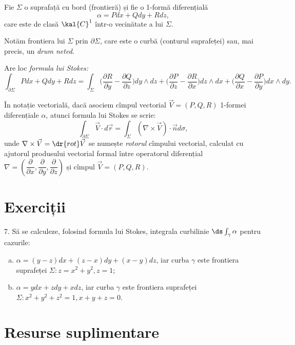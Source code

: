 Fie $ \Sigma $ o suprafață cu bord (frontieră) și fie o 1-formă diferențială
\[
  \alpha = Pdx + Qdy + Rdz,
\]
care este de clasă $ \kal{C}^1 $ într-o vecinătate a lui $ \Sigma $.

Notăm frontiera lui $ \Sigma $ prin $ \partial \Sigma $, care este o
curbă (conturul suprafeței) sau, mai precis, un \emph{drum neted}.

Are loc \emph{formula lui Stokes:}
\[
  \int_{\partial \Sigma} Pdx + Qdy + Rdz = %
  \int_\Sigma \Big( \frac{\partial R}{\partial y} - %
  \frac{\partial Q}{\partial z} \Big) dy \wedge dz + %
  \Big( \frac{\partial P}{\partial z} - %
  \frac{\partial R}{\partial x} \Big) dz \wedge dx + %
  \Big( \frac{\partial Q}{\partial x} - %
  \frac{\partial P}{\partial y}\Big) dx \wedge dy.
\]

În notație vectorială, dacă asociem cîmpul vectorial $ \vec{V} = (P, Q, R) $
1-formei diferențiale $ \alpha $, atunci formula lui Stokes se scrie:
\[
  \int_{\partial \Sigma} \vec{V} \cdot d\vec{r} = %
  \int_\Sigma (\nabla \times \vec{V}) \cdot \vec{n} d \sigma,
\]
unde $ \nabla \times \vec{V} = \dr{rot} \vec{V} $ se numește \emph{rotorul}
cîmpului vectorial, calculat cu ajutorul produsului vectorial formal între
operatorul diferențial $ \nabla = \left( \dfrac{\partial}{\partial x}, %
\dfrac{\partial}{\partial y}, \dfrac{\partial}{\partial z} \right) $ și
cîmpul $ \vec{V} = (P, Q, R) $.



\section{Exerciții}

7. Să se calculeze, folosind formula lui Stokes, integrala curbilinie
$ \ds\int_\gamma \alpha $ pentru cazurile:
\begin{enumerate}[(a)]
\item $ \alpha = (y - z) dx + (z - x) dy + (x - y) dz $, iar curba $ \gamma $
  este frontiera suprafeței $ \Sigma : z = x^2 + y^2, z = 1 $;
\item $ \alpha = y dx + zdy + xdz $, iar curba $ \gamma $ este frontiera
  suprafeței $ \Sigma: x^2 + y^2 + z^2 = 1, x + y + z = 0 $.
\end{enumerate}


\section{Resurse suplimentare}

